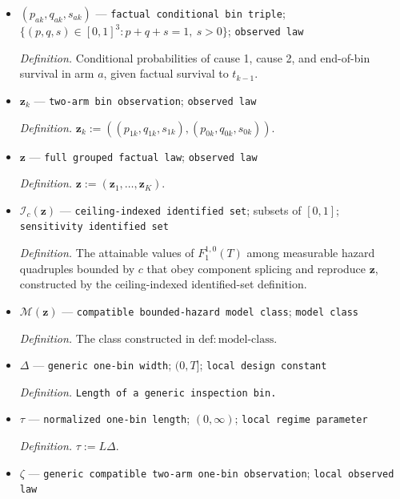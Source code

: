 \documentclass{article}
\begin{document}
\begin{itemize}
  \par\smallskip\noindent\emph{Definition.} Treatment, first-failure inspection bin and adjudicated cause, or survival through \(T\), for subject \(i\).
  \item \((p_{ak},q_{ak},s_{ak})\) --- \texttt{factual conditional bin triple}; \(\{(p,q,s)\in[0,1]^3:p+q+s=1,\ s>0\}\); \texttt{observed law}
  \par\smallskip\noindent\emph{Definition.} Conditional probabilities of cause 1, cause 2, and end-of-bin survival in arm \(a\), given factual survival to \(t_{k-1}\).
  \item \(\mathbf z_k\) --- \texttt{two-\allowbreak{}arm bin observation}; \texttt{observed law}
  \par\smallskip\noindent\emph{Definition.} \(\mathbf z_k:=((p_{1k},q_{1k},s_{1k}),(p_{0k},q_{0k},s_{0k}))\).
  \item \(\mathbf z\) --- \texttt{full grouped factual law}; \texttt{observed law}
  \par\smallskip\noindent\emph{Definition.} \(\mathbf z:=(\mathbf z_1,\ldots,\mathbf z_K)\).
  \item \(\mathcal I_c(\mathbf z)\) --- \texttt{ceiling-\allowbreak{}indexed identified set}; subsets of \([0,1]\); \texttt{sensitivity identified set}
  \par\smallskip\noindent\emph{Definition.} The attainable values of \(F_1^{1,0}(T)\) among measurable hazard quadruples bounded by \(c\) that obey component splicing and reproduce \(\mathbf z\), constructed by the ceiling-indexed identified-set definition.
  \item \(\mathcal M(\mathbf z)\) --- \texttt{compatible bounded-\allowbreak{}hazard model class}; \texttt{model class}
  \par\smallskip\noindent\emph{Definition.} The class constructed in \(\mathrm{def{:}model\text{-}class}\).
  \item \(\Delta\) --- \texttt{generic one-\allowbreak{}bin width}; \((0,T]\); \texttt{local design constant}
  \par\smallskip\noindent\emph{Definition.} \texttt{Length of a generic inspection bin.}
  \item \(\tau\) --- \texttt{normalized one-\allowbreak{}bin length}; \((0,\infty)\); \texttt{local regime parameter}
  \par\smallskip\noindent\emph{Definition.} \(\tau:=L\Delta\).
  \item \(\zeta\) --- \texttt{generic compatible two-\allowbreak{}arm one-\allowbreak{}bin observation}; \texttt{local observed law}

\end{itemize}
\end{document}
